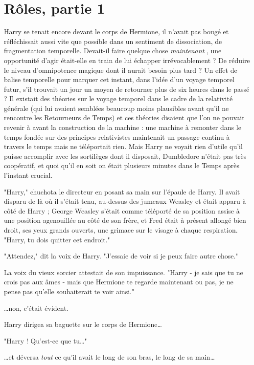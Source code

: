 
\chapter{Rôles, partie 1}

Harry se tenait encore devant le corps de Hermione, il n'avait pas bougé et réfléchissait aussi vite que possible dans un sentiment de dissociation, de fragmentation temporelle. Devait-il faire quelque chose \emph{maintenant} , une opportunité d'agir était-elle en train de lui échapper irrévocablement ? De réduire le niveau d'omnipotence magique dont il aurait besoin plus tard ? Un effet de balise temporelle pour marquer cet instant, dans l'idée d'un voyage temporel futur, s'il trouvait un jour un moyen de retourner plus de six heures dans le passé ? Il existait des théories sur le voyage temporel dans le cadre de la relativité générale (qui lui avaient semblées beaucoup moins plausibles avant qu'il ne rencontre les Retourneurs de Temps) et ces théories disaient que l'on ne pouvait revenir à avant la construction de la machine : une machine à remonter dans le temps fondée sur des principes relativistes maintenait un passage continu à travers le temps mais ne téléportait rien. Mais Harry ne voyait rien d'utile qu'il puisse accomplir avec les sortilèges dont il disposait, Dumbledore n'était pas très coopératif, et quoi qu'il en soit on était plusieurs minutes dans le Temps après l'instant crucial.

"Harry," chuchota le directeur en posant sa main sur l'épaule de Harry. Il avait disparu de là où il s'était tenu, au-dessus des jumeaux Weasley et était apparu à côté de Harry ; George Weasley s'était comme téléporté de sa position assise à une position agenouillée au côté de son frère, et Fred était à présent allongé bien droit, ses yeux grands ouverts, une grimace sur le visage à chaque respiration. "Harry, tu dois quitter cet endroit."

"Attendez," dit la voix de Harry. "J'essaie de voir si je peux faire autre chose."

La voix du vieux sorcier attestait de son impuissance. "Harry - je sais que tu ne crois pas aux âmes - mais que Hermione te regarde maintenant ou pas, je ne pense pas qu'elle souhaiterait te voir ainsi."

…non, c'était évident.

Harry dirigea sa baguette sur le corps de Hermione…

"Harry ! Qu'est-ce que tu…"

…et déversa \emph{tout}  ce qu'il avait le long de son bras, le long de sa main…

